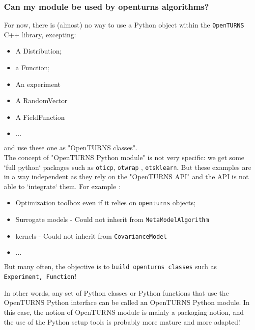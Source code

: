 \documentclass[8pt]{beamer}
\begin{document}
\begin{frame}
  \frametitle{Can my module be used by openturns algorithms?}
  \begin{block}{}
    For now, there is (almost) no way to use a Python object within the \texttt{OpenTURNS} C++ library, excepting:
    \begin{itemize}
    \item A Distribution;
    \item a Function;
    \item An experiment
    \item A RandomVector
    \item A FieldFunction
    \item $\hdots$
    \end{itemize}
    and use these one as "OpenTURNS classes".\\

    The concept of "OpenTURNS Python module" is not very specific: 
    we get some `full python` packages such as \texttt{oticp}, \texttt{otwrap} , \texttt{otsklearn}. 
    But these examples are in a way independent as they rely on the "OpenTURNS API" and the API is not able to `integrate` them.
    For example :
    \begin{itemize}
    \item Optimization toolbox even if it relies on \texttt{openturns} objects;
    \item Surrogate models - Could not inherit from \texttt{MetaModelAlgorithm} 
    \item kernels - Could not inherit from \texttt{CovarianceModel} 
    \item $\hdots$
    \end{itemize}
    But many often, the objective is to \texttt{build openturns classes} such as \texttt{Experiment, Function}!
    
    In other words, any set of Python classes or Python functions that use the OpenTURNS Python interface can be called an OpenTURNS Python module. 
    In this case, the notion of OpenTURNS module is mainly a packaging notion, and the use of the Python setup tools is probably more mature and more adapted!
  \end{block}
\end{frame}
\end{document}
